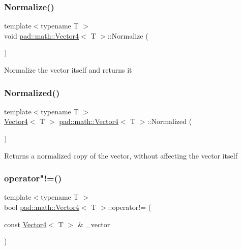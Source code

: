 \subsubsection{\texorpdfstring{Normalize()}{Normalize()}}
{\footnotesize\ttfamily template$<$typename T $>$ \\
void \mbox{\hyperlink{structpad_1_1math_1_1_vector4}{pad\+::math\+::\+Vector4}}$<$ T $>$\+::Normalize (\begin{DoxyParamCaption}{ }\end{DoxyParamCaption})}

Normalize the vector itself and returns it \mbox{\label{structpad_1_1math_1_1_vector4_a984da7891140213ff81038628beae587}} 
\subsubsection{\texorpdfstring{Normalized()}{Normalized()}}
{\footnotesize\ttfamily template$<$typename T $>$ \\
\mbox{\hyperlink{structpad_1_1math_1_1_vector4}{Vector4}}$<$ T $>$ \mbox{\hyperlink{structpad_1_1math_1_1_vector4}{pad\+::math\+::\+Vector4}}$<$ T $>$\+::Normalized (\begin{DoxyParamCaption}{ }\end{DoxyParamCaption})}

Returns a normalized copy of the vector, without affecting the vector itself \mbox{\label{structpad_1_1math_1_1_vector4_ad8e026dad9a90b1f38211054b16ff68f}} 
\subsubsection{\texorpdfstring{operator"!=()}{operator!=()}}
{\footnotesize\ttfamily template$<$typename T $>$ \\
bool \mbox{\hyperlink{structpad_1_1math_1_1_vector4}{pad\+::math\+::\+Vector4}}$<$ T $>$\+::operator!= (\begin{DoxyParamCaption}\item[{const \mbox{\hyperlink{structpad_1_1math_1_1_vector4}{Vector4}}$<$ T $>$ \&}]{\+\_\+vector }\end{DoxyParamCaption})}

